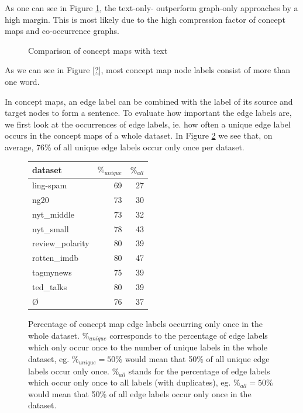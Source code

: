 As one can see in Figure \ref{fig:results_cmap_vs_text}, the text-only- outperform graph-only approaches by a high margin.
This is most likely due to the high compression factor of concept maps and co-occurrence graphs.

\begin{figure}[ht]
\centering
\missingfigure[figcolor=white]{}
\caption{Comparison of concept maps with text}
\label{fig:results_cmap_vs_text}
\end{figure}

As we can see in Figure \ref{?}, most concept map node labels consist of more than one word. 


In concept maps, an edge label can be combined with the label of its source and target nodes to form a sentence.
To evaluate how important the edge labels are, we first look at the occurrences of edge labels, ie. how often a unique edge label occurs in the concept maps of a whole dataset.
In Figure \ref{fig:edge_label_occurrences} we see that, on average, 76\% of all unique edge labels occur only once per dataset.


\begin{figure}[ht]
	\centering
	\begin{tabular}{lrr}
		dataset &  $ \%_{unique} $ & $ \%_{all}$  \\
		\midrule
		ling-spam       & 69 & 27 \\
		ng20            & 73 & 30 \\
		nyt\_middle      & 73 & 32 \\
		nyt\_small       & 78 & 43 \\
		review\_polarity & 80 & 39 \\
		rotten\_imdb     & 80 & 47 \\
		tagmynews       & 75 & 39 \\
		ted\_talks       & 80 & 39 \\
		\midrule
		\O           & 76 & 37 \\
		\bottomrule
	\end{tabular}
	\caption{Percentage of concept map edge labels occurring only once in the whole dataset.
		$ \%_{unique} $ corresponds to the percentage of edge labels which only occur once to the number of unique labels in the whole dataset, eg. $ \%_{unique} = 50\% $ would mean that 50\% of all unique edge labels occur only once.
		$ \%_{all}$ stands for the percentage of edge labels which occur only once to all labels (with duplicates), eg. $ \%_{all} = 50\%$ would mean that 50\% of all edge labels occur only once in the dataset.}\label{fig:edge_label_occurrences}
\end{figure}

